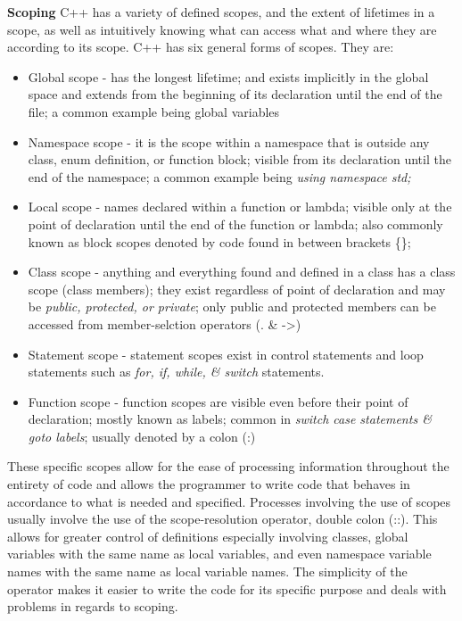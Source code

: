 \documentclass[12pt]{article}
\begin{document}
\textbf{Scoping} C++ has a variety of defined scopes, and the extent of lifetimes in a scope, as well as intuitively knowing what can access what and where they are according to its scope. C++ has six general forms of scopes. They are:
\begin{itemize}
  \item Global scope - has the longest lifetime; and exists implicitly in the global space and extends from the beginning of its declaration until the end of the file; a common example being global variables
  \item Namespace scope - it is the scope within a namespace that is outside any class, enum definition, or function block; visible from its declaration until the end of the namespace; a common example being \textit{using namespace std;}
  \item Local scope - names declared within a function or lambda; visible only at the point of declaration until the end of the function or lambda; also commonly known as block scopes denoted by code found in between brackets \{\};
  \item Class scope - anything and everything found and defined in a class has a class scope (class members); they exist regardless of point of declaration and may be \textit{public, protected, or private}; only public and protected members can be accessed from member-selction operators (. \& -\textgreater)
  \item Statement scope - statement scopes exist in control statements and loop statements such as \textit{for, if, while, \& switch} statements.
  \item Function scope - function scopes are visible even before their point of declaration; mostly known as labels; common in \textit{switch case statements \& goto labels}; usually denoted by a colon (:)
\end{itemize}

These specific scopes allow for the ease of processing information throughout the entirety of code and allows the programmer to write code that behaves in accordance to what is needed and specified. Processes involving the use of scopes usually involve the use of the scope-resolution operator, double colon (::). This allows for greater control of definitions especially involving classes, global variables with the same name as local variables, and even namespace variable names with the same name as local variable names. The simplicity of the operator makes it easier to write the code for its specific purpose and deals with problems in regards to scoping. 
\end{document}
